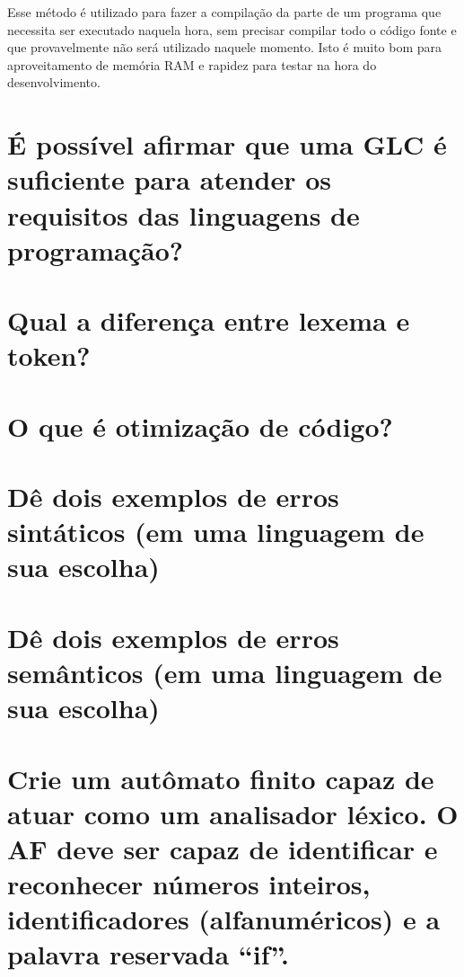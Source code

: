 \documentclass{article}
\begin{document}
Esse método é utilizado para fazer a compilação da parte de um programa que necessita ser executado naquela hora,
sem precisar compilar todo o código fonte e que provavelmente não será utilizado naquele momento.
Isto é muito bom para aproveitamento de memória RAM e rapidez para testar na hora do desenvolvimento.

\section{É possível afirmar que uma GLC é suficiente para atender os requisitos das linguagens de programação?}

\section{Qual a diferença entre lexema e token?}

\section{O que é otimização de código?}

\section{Dê dois exemplos de erros sintáticos (em uma linguagem de sua escolha)}

\section{Dê dois exemplos de erros semânticos (em uma linguagem de sua escolha)}

\section{Crie um autômato finito capaz de atuar como um analisador léxico. O AF deve ser capaz de identificar e reconhecer números inteiros, identificadores (alfanuméricos) e a palavra reservada “if”.}
\end{document}
